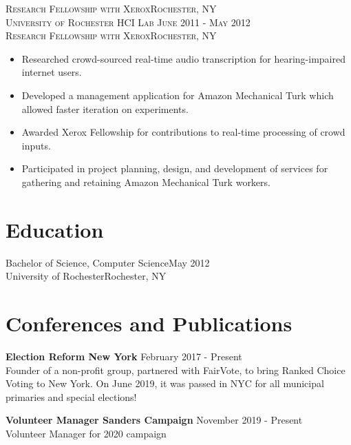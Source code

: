 \documentclass[oneside, final]{scrartcl}
\begin{document}
\begin{center}
    \textsc{Research Fellowship with Xerox\hfill Rochester, NY\\}
    \textsc{University of Rochester HCI Lab \hfill June 2011 - May 2012\\}
    \textsc{Research Fellowship with Xerox\hfill Rochester, NY\\}
    \begin{itemize}
      \setlength{\itemsep}{1pt}
      \setlength{\parskip}{0pt}
      \setlength{\parsep}{0pt}
      \setlength{\leftmargin}{-5mm}
          \item Researched crowd-sourced real-time audio transcription for hearing-impaired internet users.
          \item Developed a management application for Amazon Mechanical Turk which allowed faster iteration on experiments.
          \item Awarded Xerox Fellowship for contributions to real-time processing of crowd inputs.
          \item Participated in project planning, design, and development of services for gathering and retaining Amazon Mechanical Turk workers.
    \end{itemize}


\clearpage

\section{Education}
Bachelor of Science, Computer Science\hfill May 2012\\
University of Rochester\hfill Rochester, NY\\

 \section{Conferences and Publications}
    
\begin{flushleft}

    \textbf{Election Reform New York} \hfill February  2017 - Present\\
    Founder of a non-profit group, partnered with FairVote, to bring Ranked Choice Voting to New York.
    On June 2019, it was passed in NYC for all municipal primaries and special elections!
    \vspace{10pt}    


    \textbf{Volunteer Manager Sanders Campaign} \hfill November  2019 - Present\\
    Volunteer Manager for 2020 campaign 
    \vspace{10pt}    
        

\end{flushleft}
\end{center}
\end{document}
